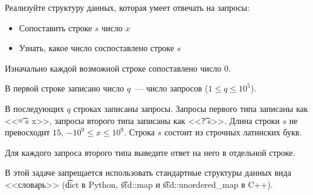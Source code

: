 Реализуйте структуру данных, которая умеет отвечать на запросы:

\begin{itemize}
    \item Сопоставить строке $s$ число $x$
    \item Узнать, какое число соспоставлено строке $s$
\end{itemize}

Изначально каждой возможной строке сопоставлено число 0.

\InputFile

В первой строке записано число $q$~--- число запросов ($1 \le q \le 10^5$).

В последующих $q$ строках записаны запросы. Запросы первого типа записаны
как <<\t{= s x}>>, запросы второго типа записаны как <<\t{? s}>>.
Длина строки $s$ не превосходит $15$, $-10^9 \le x \le 10^9$.
Строка $s$ состоит из строчных латинских букв.

\OutputFile

Для каждого запроса второго типа выведите ответ на него в отдельной строке.

\SAMPLES

\Notes

В этой задаче запрещается использовать стандартные структуры данных вида <<словарь>>
(\t{dict} в Python, \t{std::map} и \t{std::unordered\_map} в C++).
